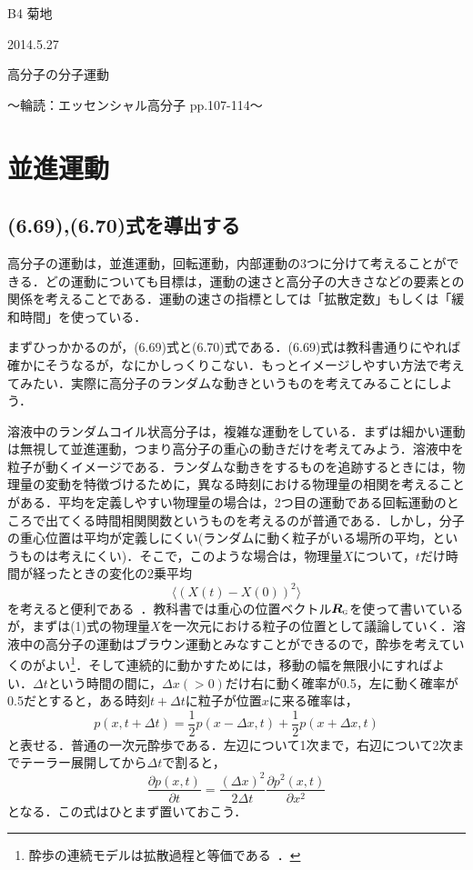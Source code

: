 \documentclass{jsarticle}
\begin{document}
\begin{flushright}
B4 菊地

2014.5.27 
\end{flushright}

\begin{center}
\LARGE 高分子の分子運動

\large 〜輪読：エッセンシャル高分子 pp.107-114〜 
\end{center}
\section{並進運動}
\subsection{(6.69),(6.70)式を導出する}
高分子の運動は，並進運動，回転運動，内部運動の3つに分けて考えることができる．どの運動についても目標は，運動の速さと高分子の大きさなどの要素との関係を考えることである．運動の速さの指標としては「拡散定数」もしくは「緩和時間」を使っている．

まずひっかかるのが，(6.69)式と(6.70)式である．(6.69)式は教科書通りにやれば確かにそうなるが，なにかしっくりこない．もっとイメージしやすい方法で考えてみたい．実際に高分子のランダムな動きというものを考えてみることにしよう．

溶液中のランダムコイル状高分子は，複雑な運動をしている．まずは細かい運動は無視して並進運動，つまり高分子の重心の動きだけを考えてみよう．溶液中を粒子が動くイメージである．ランダムな動きをするものを追跡するときには，物理量の変動を特徴づけるために，異なる時刻における物理量の相関を考えることがある．平均を定義しやすい物理量の場合は，2つ目の運動である回転運動のところで出てくる時間相関関数というものを考えるのが普通である．しかし，分子の重心位置は平均が定義しにくい(ランダムに動く粒子がいる場所の平均，というものは考えにくい)．そこで，このような場合は，物理量$X$について，$t$だけ時間が経ったときの変化の2乗平均
\begin{equation}
\langle (X(t)-X(0))^2 \rangle
\end{equation}
を考えると便利である~\cite{土井}．教科書では重心の位置ベクトル$\bm{R}_{\scalebox{0.5}{G}}$を使って書いているが，まずは(1)式の物理量$X$を一次元における粒子の位置として議論していく．溶液中の高分子の運動はブラウン運動とみなすことができるので，酔歩を考えていくのがよい\footnote{酔歩の連続モデルは拡散過程と等価である~\cite{米沢}．}．そして連続的に動かすためには，移動の幅を無限小にすればよい．$\varDelta t$という時間の間に，$\varDelta x(>0)$だけ右に動く確率が0.5，左に動く確率が0.5だとすると，ある時刻$t+\varDelta t$に粒子が位置$x$に来る確率は，
\begin{equation}
p(x,t+\varDelta t)=\dfrac{1}{2}p(x-\varDelta x,t)+\dfrac{1}{2}p(x+\varDelta x,t)
\end{equation}
と表せる．普通の一次元酔歩である．左辺について1次まで，右辺について2次までテーラー展開してから$\varDelta t$で割ると，
\begin{equation}
\frac{\partial p(x,t)}{\partial t}=\frac{(\varDelta x)^2}{2\varDelta t}\frac{\partial p^2 (x,t)}{\partial x^2}
\end{equation}
となる．この式はひとまず置いておこう．
\end{document}
